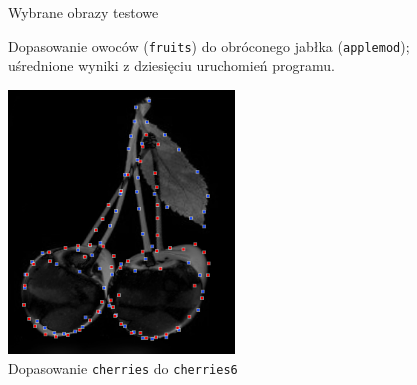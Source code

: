 \documentclass[a4paper,12pt,leqno]{article}
\begin{document}
\begin{figure}\centering
{}
\caption{Wybrane obrazy testowe}
\end{figure}

\begin{figure}\centering
\footnotesize\vspace{-2em}
\normalsize\caption{Dopasowanie owoców (\texttt{fruits}) do obróconego jabłka (\texttt{applemod}); uśrednione wyniki z dziesięciu uruchomień programu.}
\end{figure} 

\begin{figure}\centering
\includegraphics[width=6cm,keepaspectratio=true]{./cherries-match.png}
\caption{Dopasowanie \texttt{cherries} do \texttt{cherries6}}
\end{figure}
\end{document}
